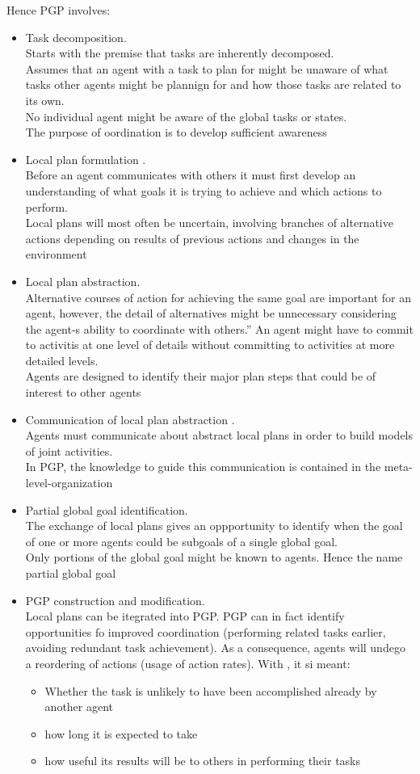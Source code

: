Hence PGP involves:
\begin{itemize}
\item Task decomposition.\\
Starts with the premise that tasks are inherently decomposed.\\
Assumes that an agent with a task to plan for might be unaware of what tasks other agents might be plannign for and how those tasks are related to its own.\\
No individual agent might be aware of the global tasks or states.\\
The purpose of oordination is to develop sufficient awareness
\item Local plan formulation .\\
Before an agent communicates with others it must first develop an understanding of what goals it is trying to achieve and which actions to perform.\\
Local plans will most often be uncertain, involving branches of alternative actions depending on results of previous actions and changes in the environment
\item Local plan abstraction.\\
Alternative courses of action for achieving the same goal are important for an agent, however, the detail of alternatives might be unnecessary considering the agent-s ability to coordinate with others.''
An agent might have to commit to activitis at one level of details without committing to activities at more detailed levels.\\
Agents are designed to identify their major plan steps that could be of interest to other agents
\item Communication of local plan abstraction .\\
Agents must communicate about abstract local plans in order to build models of joint activities.\\
In PGP, the knowledge to guide this communication is contained in the meta-level-organization
\item Partial global goal identification.\\
The exchange of local plans gives an oppportunity to identify when the goal of one or more agents could be subgoals of a single global goal.\\
Only portions of the global goal might be known to agents. Hence the name partial global goal
\item PGP construction and modification.\\
Local plans can be itegrated into PGP. PGP can in fact identify opportunities fo improved coordination (performing related tasks earlier, avoiding redundant task achievement).
As a consequence, agents will undego a reordering of actions (usage of action rates).
With , it si meant:
\begin{itemize}
\item Whether the task is unlikely to have been accomplished already by another agent
\item how long it is expected to take
\item how useful its results will be to others in performing their tasks
\end{itemize}


\end{itemize}
